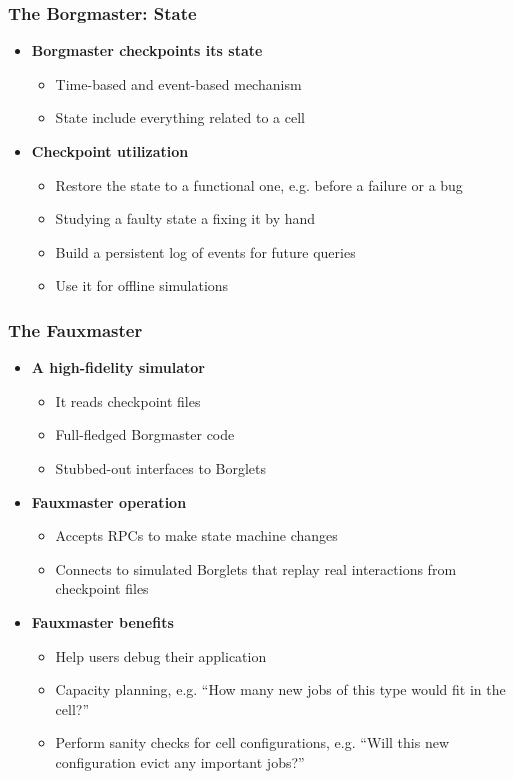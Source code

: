\begin{frame}
\frametitle{The Borgmaster: State}
\begin{itemize}
	\item {\bf Borgmaster checkpoints its state}
	\begin{itemize}
		\item Time-based and event-based mechanism
		\item State include everything related to a cell
	\end{itemize}

\vspace{20pt}

	\item {\bf Checkpoint utilization}
	\begin{itemize}
		\item Restore the state to a functional one, e.g. before a failure or a bug
		\item Studying a faulty state a fixing it by hand
		\item Build a persistent log of events for future queries
		\item Use it for offline simulations
	\end{itemize}
\end{itemize}
\end{frame}

\begin{frame}
\frametitle{The Fauxmaster}
\begin{itemize}
	\item {\bf A high-fidelity simulator}
	\begin{itemize}
		\item It reads checkpoint files
		\item Full-fledged Borgmaster code
		\item Stubbed-out interfaces to Borglets
	\end{itemize}
	\item {\bf Fauxmaster operation}
	\begin{itemize}
		\item Accepts RPCs to make state machine changes
		\item Connects to simulated Borglets that replay real interactions from checkpoint files
	\end{itemize}
	\item {\bf Fauxmaster benefits}
	\begin{itemize}
		\item Help users debug their application
		\item Capacity planning, e.g. ``How many new jobs of this type would fit in the cell?''
		\item Perform sanity checks for cell configurations, e.g. ``Will this new configuration evict any important jobs?''
	\end{itemize}
\end{itemize}
\end{frame}

